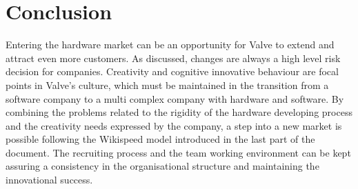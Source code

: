 \documentclass[12pt,twoside,notitle,a4paper]{article}
\begin{document}
\section{Conclusion}

Entering the hardware market can be an opportunity for Valve to extend and attract even more customers.
As discussed, changes are always a high level risk decision for companies.
Creativity and cognitive innovative behaviour are focal points in Valve’s culture, which must be maintained in the transition from a software company to a multi complex company with hardware and software.
By combining  the problems related to the rigidity of the hardware developing process and the creativity needs expressed by the company, a step into a new market is possible following the Wikispeed model introduced in the last part of the document.
The recruiting process and the team working environment can be kept assuring a consistency in the organisational structure and maintaining the innovational success.


\newpage



\end{document}
